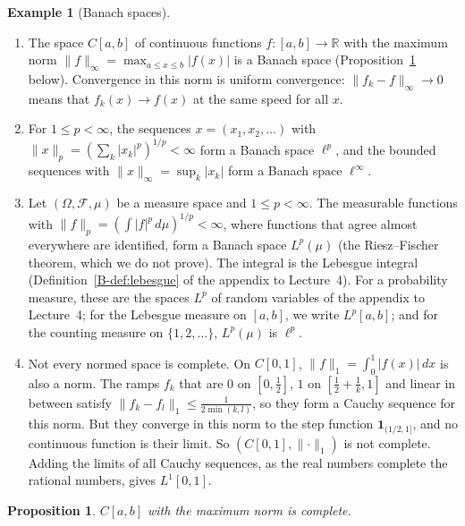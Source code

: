 \documentclass[11pt]{article}
\newcommand{\norm}[1]{\lVert #1 \rVert}
\theoremstyle{definition}
\newtheorem{example}[definition]{Example}
\theoremstyle{plain}
\newtheorem{proposition}[definition]{Proposition}
\theoremstyle{remark}
\begin{document}
\begin{example}[Banach spaces]\label{ex:banach-spaces}
    \begin{enumerate}
        \item The space $C[a, b]$ of continuous functions $f: [a, b] \to \mathbb{R}$ with the maximum norm $\norm{f}_\infty = \max_{a \leq x \leq b}|f(x)|$ is a Banach space (Proposition~\ref{prop:c-complete} below). Convergence in this norm is uniform convergence: $\norm{f_k - f}_\infty \to 0$ means that $f_k(x) \to f(x)$ at the same speed for all $x$.
        \item For $1 \leq p < \infty$, the sequences $x = (x_1, x_2, \ldots)$ with $\norm{x}_p = (\sum_k |x_k|^p)^{1/p} < \infty$ form a Banach space $\ell^p$, and the bounded sequences with $\norm{x}_\infty = \sup_k |x_k|$ form a Banach space $\ell^\infty$.
        \item Let $(\Omega, \mathcal{F}, \mu)$ be a measure space and $1 \leq p < \infty$. The measurable functions with $\norm{f}_p = (\int |f|^p\, d\mu)^{1/p} < \infty$, where functions that agree almost everywhere are identified, form a Banach space $L^p(\mu)$ (the Riesz--Fischer theorem, which we do not prove). The integral is the Lebesgue integral (Definition~\ref{B-def:lebesgue} of the appendix to Lecture~4). For a probability measure, these are the spaces $L^p$ of random variables of the appendix to Lecture~4; for the Lebesgue measure on $[a, b]$, we write $L^p[a, b]$; and for the counting measure on $\{1, 2, \ldots\}$, $L^p(\mu)$ is $\ell^p$.
        \item Not every normed space is complete. On $C[0, 1]$, $\norm{f}_1 = \int_0^1 |f(x)|\, dx$ is also a norm. The ramps $f_k$ that are $0$ on $[0, \frac{1}{2}]$, $1$ on $[\frac{1}{2} + \frac{1}{k}, 1]$ and linear in between satisfy $\norm{f_k - f_l}_1 \leq \frac{1}{2\min(k, l)}$, so they form a Cauchy sequence for this norm. But they converge in this norm to the step function $\mathbf{1}_{(1/2, 1]}$, and no continuous function is their limit. So $(C[0, 1], \norm{\cdot}_1)$ is not complete. Adding the limits of all Cauchy sequences, as the real numbers complete the rational numbers, gives $L^1[0, 1]$.
    \end{enumerate}
\end{example}

\begin{proposition}\label{prop:c-complete}
    $C[a, b]$ with the maximum norm is complete.
\end{proposition}
\end{document}
